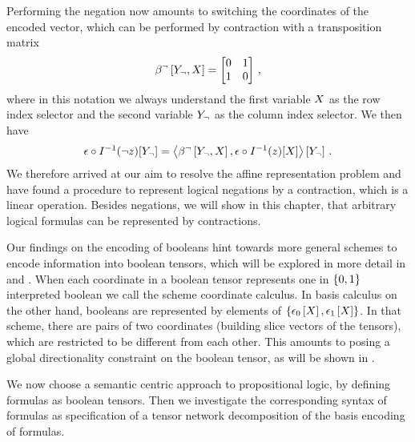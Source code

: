 Performing the negation now amounts to switching the coordinates of the encoded vector, which can be performed by contraction with a transposition matrix
\begin{align*}
	\beta^{\lnot}\left[Y_{\lnot},X\right] =
	\begin{bmatrix}
		0 & 1 \\
		1 & 0
	\end{bmatrix} \, ,
\end{align*}
where in this notation we always understand the first variable $X$ as the row index selector and the second variable $Y_{\lnot}$ as the column index selector.
We then have
\begin{align*}
	\epsilon\circ I^{-1}(\lnot z)[Y_{\lnot}]
	= \left\langle \beta^{\lnot}\left[Y_{\lnot},X\right],\epsilon\circ I^{-1}(z)[X]\right\rangle \left[ Y_{\lnot} \right] \, .
\end{align*}
We therefore arrived at our aim to resolve the affine representation problem and have found a procedure to represent logical negations by a contraction, which is a linear operation.
Besides negations, we will show in this chapter, that arbitrary logical formulas can be represented by contractions.


Our findings on the encoding of booleans hint towards more general schemes to encode information into boolean tensors, which will be explored in more detail in  and .
When each coordinate in a boolean tensor represents one in $\{0,1\}$ interpreted boolean we call the scheme coordinate calculus.
In basis calculus on the other hand, booleans are represented by elements of $\{\epsilon_0\left[X\right],\epsilon_1\left[X\right]\}$.
In that scheme, there are pairs of two coordinates (building slice vectors of the tensors), which are restricted to be different from each other.
This amounts to posing a global directionality constraint on the boolean tensor, as will be shown in .


We now choose a semantic centric approach to propositional logic, by defining formulas as boolean tensors.
Then we investigate the corresponding syntax of formulas as specification of a tensor network decomposition of the basis encoding of formulas.

